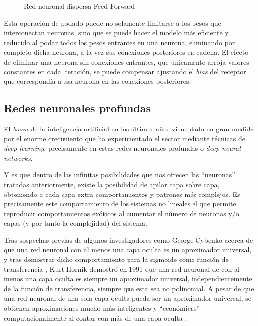 \begin{figure}[h!]
    \centering
    \vspace*{0.5cm}
    \def\svgwidth{0.85\textwidth}
    
    \caption{Red neuronal dispersa Feed-Forward}
    \label{fig:sparse_nn_sample}
\end{figure}

Esta operación de podado puede no solamente limitarse a los pesos que interconectan neuronas, sino que se puede hacer el modelo más eficiente y reducido al podar todos los pesos entrantes en una neurona, eliminando por completo dicha neurona, a la vez sus conexiones posteriores en cadena. El efecto de eliminar una neurona sin conexiones entrantes, que únicamente arroja valores constantes en cada iteración, se puede compensar ajustando el \textit{bias} del receptor que correspondía a esa neurona en las conexiones posteriores.

\subsection{Redes neuronales profundas}
\label{ssec:redes_reuronales_profundas}
El \textit{boom} de la inteligencia artificial en los últimos años viene dado en gran medida por el enorme crecimiento que ha experimentado el sector mediante técnicas de \textit{deep learning}, precisamente en estas redes neuronales profundas o \textit{deep neural networks}.

Y es que dentro de las infinitas posibilidades que nos ofrecen las ``neuronas'' tratadas anteriormente, existe la posibilidad de apilar capa sobre capa, obteniendo a cada capa extra comportamientos y patrones más complejos.
Es precisamente este comportamiento de los sistemas no lineales el que permite reproducir comportamientos exóticos al aumentar el número de neuronas y/o capas (y por tanto la complejidad) del sistema.

Tras sospechas previas de algunos investigadores como George Cybenko acerca de que una red neuronal con al menos una capa oculta es un aproximador universal, y tras demostrar dicho comportamiento para la sigmoide como función de transferencia \cite{cybenko1989approximation}, Kurt Hornik demostró en 1991 que una red neuronal de con al menos una capa oculta es siempre un aproximador universal, independientemente de la función de transferencia, siempre que esta sea no polinomial. A pesar de que una red neuronal de una sola capa oculta pueda ser un aproximador universal, se obtienen aproximaciones mucho más inteligentes y ``económicas'' computacionalmente al contar con más de una capa oculta \cite{hornik1991approximation}.



